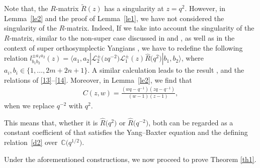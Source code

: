 \documentclass[pdftex]{sigma}
\numberwithin{equation}{section}
\begin{document}
\begin{Remark}Note that, the $R$-matrix $\widetilde{R}(z)$ has a singularity at $z=q^{2}$. However, in Lemma~\ref{le2} and the proof of Lemma~\ref{le1}, we have not considered the singularity of the $R$-matrix. Indeed, If we take into account the singularity of the $R$-matrix, similar to the non-super case discussed in \cite{JMA} and \cite{JMAB}, as well as in the context of super orthosymplectic Yangians \cite{AIM}, we have to redefine the following relation
$l^{\pm a_1a_2}_{b_1b_2}(z)=\langle a_1, a_2|\mathcal{L}_2^{\pm}\bigl(zq^{-2}\bigr)\mathcal{L}_1^{\pm}(z)\widehat{R}\bigl(q^{2}\bigr)|b_1, b_2\rangle$,
where $a_i, b_i\in\{1,\dots,2m+2n+1\}$. A similar calculation leads to the result
,
and the relations of \eqref{13}--\eqref{14}. Moreover, in Lemma~\ref{le2}, we find that
\begin{gather*}
 C(z,w)
=\frac{(wq-q^{-1})(zq-q^{-1})}{(w-1)(z-1)},
\end{gather*}when we replace $q^{-2}$ with $q^2$.

This means that, whether it is $\widehat{R}\bigl(q^{2}\bigr)$ or $\widehat{R}\bigl(q^{-2}\bigr)$, both can be regarded as a constant coefficient of  that satisfies the Yang--Baxter equation and the defining relation~\eqref{d2} over~$\mathbb{C}\bigl(q^{1/2}\bigr)$.
\end{Remark}



Under the aforementioned constructions, we now proceed to prove Theorem \ref{th1}.
\end{document}

